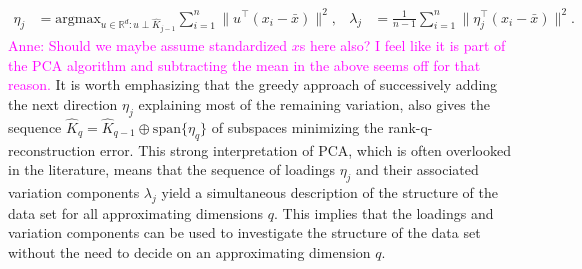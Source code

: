 \documentclass[titlepage,11pt,twoside]{article}
\newcommand{\hl}[1]{\textcolor{magenta}{#1}}
\newcommand{\RR}{\mathbb{R}}
\newcommand{\argmax}{\text{argmax}}
\begin{document}
\begin{align*}
\eta_j &= \argmax_{u \in \RR^d\colon u \perp \hat{K}_{j-1}} \sum_{i=1}^n \lVert u^\top (x_i - \bar{x}) \rVert^2, &
\lambda_j &= \frac{1}{n-1} \sum_{i=1}^n \lVert \eta_j^\top (x_i - \bar{x}) \rVert^2.
\end{align*}
\hl{Anne: Should we maybe assume standardized $x$s here also? I feel like it is part of the PCA algorithm and subtracting the mean in the above seems off for that reason.} It is worth emphasizing that the greedy approach of successively adding the next direction $\eta_j$ explaining most of the remaining variation, also gives the sequence $\hat{K}_q = \hat{K}_{q-1} \oplus \text{span} \{\eta_q\}$ of subspaces minimizing the rank-q-reconstruction error. This strong interpretation of PCA, which is often overlooked in the literature, means that the sequence of loadings $\eta_j$ and their associated variation components $\lambda_j$ yield a simultaneous description of the structure of the data set for all approximating dimensions $q$. This implies that the loadings and variation components can be used to investigate the structure of the data set without the need to decide on an approximating dimension $q$.
\end{document}

